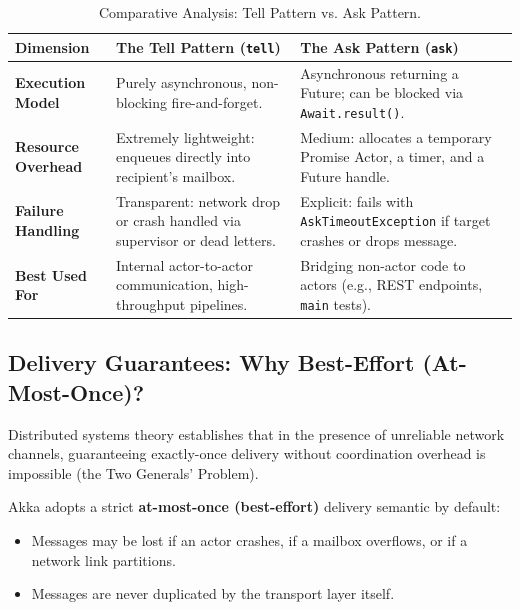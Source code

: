 \begin{table}[htbp]
\centering
\small
\begin{tabularx}{\textwidth}{l X X}
\toprule
\textbf{Dimension} & \textbf{The Tell Pattern (\texttt{tell})} & \textbf{The Ask Pattern (\texttt{ask})} \\
\midrule
\textbf{Execution Model} & Purely asynchronous, non-blocking fire-and-forget. & Asynchronous returning a Future; can be blocked via \texttt{Await.result()}. \\
\midrule
\textbf{Resource Overhead} & Extremely lightweight: enqueues directly into recipient's mailbox. & Medium: allocates a temporary Promise Actor, a timer, and a Future handle. \\
\midrule
\textbf{Failure Handling} & Transparent: network drop or crash handled via supervisor or dead letters. & Explicit: fails with \texttt{AskTimeoutException} if target crashes or drops message. \\
\midrule
\textbf{Best Used For} & Internal actor-to-actor communication, high-throughput pipelines. & Bridging non-actor code to actors (e.g., REST endpoints, \texttt{main} tests). \\
\bottomrule
\end{tabularx}
\caption{Comparative Analysis: Tell Pattern vs. Ask Pattern.}
\label{tab:tell_vs_ask}
\end{table}

\subsection{Delivery Guarantees: Why Best-Effort (At-Most-Once)?}
Distributed systems theory establishes that in the presence of unreliable network channels, guaranteeing exactly-once delivery without coordination overhead is impossible (the Two Generals' Problem).

Akka adopts a strict \textbf{at-most-once (best-effort)} delivery semantic by default:
\begin{itemize}
    \item Messages may be lost if an actor crashes, if a mailbox overflows, or if a network link partitions.
    \item Messages are never duplicated by the transport layer itself.
\end{itemize}

